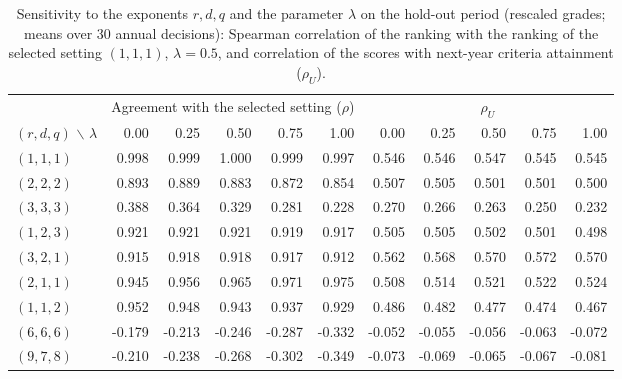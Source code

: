 \begin{table}[!htbp]
\centering
\scriptsize
\caption{Sensitivity to the exponents $r,d,q$ and the parameter $\lambda$ on the hold-out period (rescaled grades; means over 30 annual decisions): Spearman correlation of the ranking with the ranking of the selected setting $(1,1,1)$, $\lambda=0.5$, and correlation of the scores with next-year criteria attainment ($\rho_U$).}\label{tab:sens}
\begin{adjustbox}{max width=\textwidth}
\begin{tabular}{lrrrrrrrrrr}
\toprule
 & \multicolumn{5}{c}{Agreement with the selected setting ($\rho$)} & \multicolumn{5}{c}{$\rho_U$}\\
\cmidrule(lr){2-6}\cmidrule(lr){7-11}
$(r,d,q)$ $\backslash$ $\lambda$
 & 0.00 & 0.25 & 0.50 & 0.75 & 1.00 & 0.00 & 0.25 & 0.50 & 0.75 & 1.00 \\
\midrule
$(1,1,1)$ & 0.998 & 0.999 & 1.000 & 0.999 & 0.997 & 0.546 & 0.546 & 0.547 & 0.545 & 0.545 \\
$(2,2,2)$ & 0.893 & 0.889 & 0.883 & 0.872 & 0.854 & 0.507 & 0.505 & 0.501 & 0.501 & 0.500 \\
$(3,3,3)$ & 0.388 & 0.364 & 0.329 & 0.281 & 0.228 & 0.270 & 0.266 & 0.263 & 0.250 & 0.232 \\
$(1,2,3)$ & 0.921 & 0.921 & 0.921 & 0.919 & 0.917 & 0.505 & 0.505 & 0.502 & 0.501 & 0.498 \\
$(3,2,1)$ & 0.915 & 0.918 & 0.918 & 0.917 & 0.912 & 0.562 & 0.568 & 0.570 & 0.572 & 0.570 \\
$(2,1,1)$ & 0.945 & 0.956 & 0.965 & 0.971 & 0.975 & 0.508 & 0.514 & 0.521 & 0.522 & 0.524 \\
$(1,1,2)$ & 0.952 & 0.948 & 0.943 & 0.937 & 0.929 & 0.486 & 0.482 & 0.477 & 0.474 & 0.467 \\
$(6,6,6)$ & -0.179 & -0.213 & -0.246 & -0.287 & -0.332 & -0.052 & -0.055 & -0.056 & -0.063 & -0.072 \\
$(9,7,8)$ & -0.210 & -0.238 & -0.268 & -0.302 & -0.349 & -0.073 & -0.069 & -0.065 & -0.067 & -0.081 \\
\bottomrule
\end{tabular}
\end{adjustbox}
\end{table}
